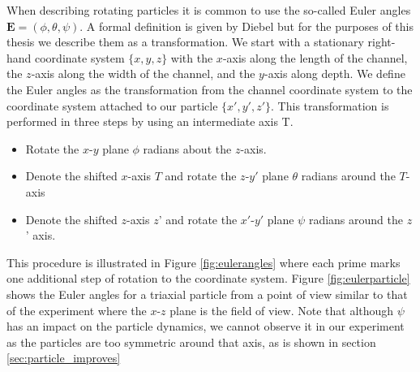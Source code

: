 When describing rotating particles it is common to use the so-called Euler angles $\mathbf{E} = (\phi, \theta, \psi)$. A formal definition is given by Diebel \cite{Euler} but for the purposes of this thesis we describe them as a transformation. We start with a stationary right-hand coordinate system $\{x,y,z\}$ with the $x$-axis along the length of the channel, the $z$-axis along the width of the channel, and the $y$-axis along depth. We define the Euler angles as the transformation from the channel coordinate system to the coordinate system attached to our particle $\{x',y',z'\}$. This transformation is performed in three steps by using an intermediate axis T.

\begin{itemize}
\item Rotate the $x$-$y$ plane $\phi$ radians about the $z$-axis. 
\item Denote the shifted $x$-axis $T$ and rotate the $z$-$y'$ plane $\theta$ radians around the $T$-axis
\item Denote the shifted $z$-axis $z$' and rotate the $x'$-$y'$ plane $\psi$ radians around the $z$' axis.
\end{itemize}

This procedure is illustrated in Figure \ref{fig:eulerangles} where each prime marks one additional step of rotation to the coordinate system. Figure \ref{fig:eulerparticle} shows the Euler angles for a triaxial particle from a point of view similar to that of the experiment where the $x$-$z$ plane is the field of view. Note that although $\psi$ has an impact on the particle dynamics, we cannot observe it in our experiment as the particles are too symmetric around that axis, as is shown in section \ref{sec:particle_improves}


